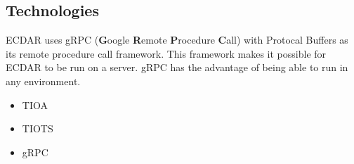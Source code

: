 \subsection{Technologies} %
ECDAR uses gRPC (\textbf{G}oogle \textbf{R}emote \textbf{P}rocedure \textbf{C}all) with Protocal Buffers as its remote procedure call framework.
This framework makes it possible for ECDAR to be run on a server. 
gRPC has the advantage of being able to run in any environment.


\begin{itemize}
    \item TIOA
    \item TIOTS
    \item gRPC
\end{itemize}













